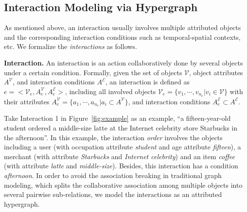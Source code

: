 \documentclass[11pt]{article}
\begin{document}
\subsection{Interaction Modeling via Hypergraph}   \label{mod:construction}

As mentioned above, an interaction usually involves multiple attributed objects and the corresponding interaction conditions such as temporal-spatial contexts, etc. We formalize the \textit{interactions} as follows.

\begin{definition}   \label{def:interaction}
	\textbf{Interaction. }
	An interaction is an action collaboratively done by several objects under a certain condition. Formally,
	given the set of objects $ \mathcal{V} $, object attributes $ A^\mathcal{V} $, and interaction conditions $ A^\mathcal{E} $, an interaction is defined as $ e = <\mathcal{V}_e, A^\mathcal{V}_e, A^\mathcal{E}_e> $, including all involved objects $ \mathcal{V}_e = \{ v_1, \cdots, v_{n_e} | v_i \in \mathcal{V} \} $ with their attributes $ A^\mathcal{V}_e = \{ a_1, \cdots, a_{n_e} | a_i \subset A^\mathcal{V} \} $, and interaction conditions $ A^\mathcal{E}_e \subset A^\mathcal{E} $.
\end{definition}

Take Interaction 1 in Figure~\ref{fig:example} as an example, ``a fifteen-year-old student ordered a middle-size latte at the Internet celebrity store Starbucks in the afternoon''. In this example, the interaction \textit{order} involves the objects including a user (with occupation attribute \textit{student} and age attribute \textit{fifteen}), a merchant (with attribute \textit{Starbucks} and \textit{Internet celebrity}) and an item \textit{coffee} (with attribute \textit{latte} and \textit{middle-size}). Besides, this interaction has a condition \textit{afternoon}.
In order to avoid the association breaking in traditional graph modeling, which splits the collaborative association among multiple objects into several pairwise sub-relations, we model the interactions as an attributed hypergraph.
\end{document}
